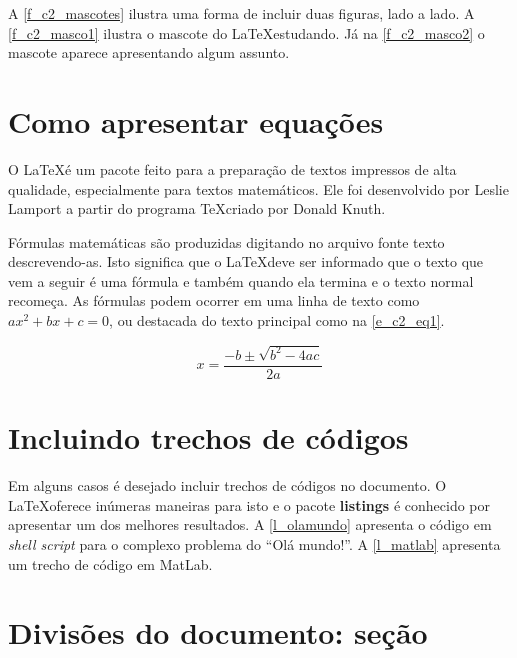 A \autoref{f_c2_mascotes} ilustra uma forma de incluir duas figuras, lado a lado. A \autoref{f_c2_masco1} ilustra o mascote do \LaTeX estudando. Já na \autoref{f_c2_masco2} o mascote aparece apresentando algum assunto. 


\section{Como apresentar equações}
\label{s_c2_equacoes}

O \LaTeX é um pacote feito para a preparação de textos impressos de alta qualidade, especialmente
para textos matemáticos. Ele foi desenvolvido por Leslie Lamport a partir do programa
\TeX criado por Donald Knuth.

Fórmulas matemáticas são produzidas digitando no arquivo fonte texto descrevendo-as. Isto
significa que o \LaTeX deve ser informado que o texto que vem a seguir é uma fórmula e também
quando ela termina e o texto normal recomeça. As fórmulas podem ocorrer em uma linha de
texto como $ax^2 + bx + c = 0$, ou destacada do texto principal como na \autoref{e_c2_eq1}.

\begin{equation}
 x=\frac{-b\pm\sqrt{b^2-4ac}}{2a}
\label{e_c2_eq1}
\end{equation}

\section{Incluindo trechos de códigos}

Em alguns casos é desejado incluir trechos de códigos no documento. O \LaTeX oferece inúmeras maneiras para isto e o pacote \textbf{listings} é conhecido por apresentar um dos melhores resultados. A \autoref{l_olamundo} apresenta o código em \textit{shell script} para o complexo problema do ``Olá mundo!''. A \autoref{l_matlab} apresenta um trecho de código em MatLab.




\section{Divisões do documento: seção}\label{sec-divisoes}

